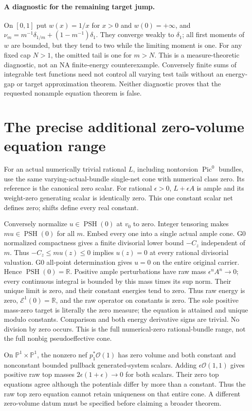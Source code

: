 \documentclass[10pt]{article}
\newcommand{\PSH}{\operatorname{PSH}}
\newcommand{\E}{\mathcal E}
\newcommand{\OO}{\mathcal O}
\begin{document}
\paragraph{A diagnostic for the remaining target jump.}
On $[0,1]$ put $w(x)=1/x$ for $x>0$ and $w(0)=+\infty$, and
$\nu_m=m^{-1}\delta_{1/m}+(1-m^{-1})\delta_1$. They converge weakly to
$\delta_1$; all first moments of $w$ are bounded, but they tend to two
while the limiting moment is one. For any fixed cap $N>1$, the omitted
tail is one for $m>N$. This is a measure-theoretic diagnostic, not an
NA finite-energy counterexample. Conversely finite sums of integrable
test functions need not control all varying test tails without an
energy-gap or target approximation theorem. Neither diagnostic proves
that the requested nonample equation theorem is false.

\section{The precise additional zero-volume equation range}
For an actual numerically trivial rational $L$, including nontorsion
$\operatorname{Pic}^0$ bundles, use the same varying-actual-bundle
single-net cone with numerical class zero. Its reference is the canonical
zero scalar. For rational $\epsilon>0$, $L+\epsilon A$ is ample and its
weight-zero generating scalar is identically zero. This one constant
scalar net defines zero; shifts define every real constant.

Conversely normalize $u\in\PSH(0)$ at $v_0$ to zero. Integer tensoring
makes $m u\in\PSH(0)$ for all $m$. Embed every one into a single actual
ample cone. G0 normalized compactness gives a finite divisorial lower
bound $-C_z$ independent of $m$. Thus $-C_z\leq m u(z)\leq0$ implies
$u(z)=0$ at every rational divisorial valuation. G0 all-point determination
gives $u=0$ on the entire original carrier. Hence $\PSH(0)=\mathbb R$.
Positive ample perturbations have raw mass $\epsilon^n A^n\to0$;
every continuous integral is bounded by this mass times its sup norm.
Their unique limit is zero, and their constant energies tend to zero.
Thus raw energy is zero, $\E^1(0)=\mathbb R$, and the raw operator on
constants is zero. The sole positive mass-zero target is literally the
zero measure; the equation is attained and unique modulo constants.
Comparison and both energy derivative signs are trivial. No division
by zero occurs. This is the full numerical-zero rational-bundle range,
not the full nonbig pseudoeffective cone.

On $\mathbb P^1\times\mathbb P^1$, the nonzero nef
$p_1^*\OO(1)$ has zero volume and both constant and nonconstant bounded
pullback generated-system scalars. Adding $\epsilon\OO(1,1)$ gives
positive raw top masses $2\epsilon(1+\epsilon)\to0$ for both scalars.
Their zero top equations agree although the potentials differ by more
than a constant. Thus the raw top zero equation cannot retain uniqueness
on that entire cone. A different zero-volume datum must be specified
before claiming a broader theorem.
\end{document}

